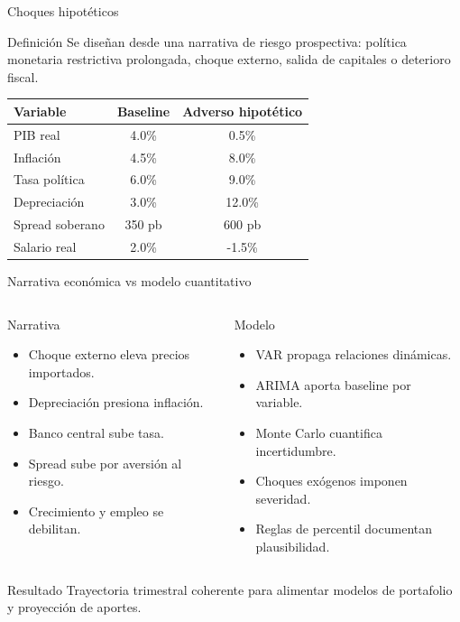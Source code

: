 \documentclass[10pt,aspectratio=169]{beamer}
\begin{document}
\begin{frame}{Choques hipotéticos}
\begin{block}{Definición}
Se diseñan desde una narrativa de riesgo prospectiva: política monetaria restrictiva prolongada, choque externo, salida de capitales o deterioro fiscal.
\end{block}

\begin{table}
\small
\begin{tabular}{lcc}
\toprule
Variable & Baseline & Adverso hipotético \\
\midrule
PIB real & 4.0\% & 0.5\% \\
Inflación & 4.5\% & 8.0\% \\
Tasa política & 6.0\% & 9.0\% \\
Depreciación & 3.0\% & 12.0\% \\
Spread soberano & 350 pb & 600 pb \\
Salario real & 2.0\% & -1.5\% \\
\bottomrule
\end{tabular}
\end{table}
\end{frame}

\begin{frame}{Narrativa económica vs modelo cuantitativo}
\begin{columns}
\begin{block}{Narrativa}
\begin{itemize}
  \item Choque externo eleva precios importados.
  \item Depreciación presiona inflación.
  \item Banco central sube tasa.
  \item Spread sube por aversión al riesgo.
  \item Crecimiento y empleo se debilitan.
\end{itemize}
\end{block}

\begin{block}{Modelo}
\begin{itemize}
  \item VAR propaga relaciones dinámicas.
  \item ARIMA aporta baseline por variable.
  \item Monte Carlo cuantifica incertidumbre.
  \item Choques exógenos imponen severidad.
  \item Reglas de percentil documentan plausibilidad.
\end{itemize}
\end{block}
\end{columns}

\vspace{0.4em}
\begin{block}{Resultado}
Trayectoria trimestral coherente para alimentar modelos de portafolio y proyección de aportes.
\end{block}
\end{frame}
\end{document}
